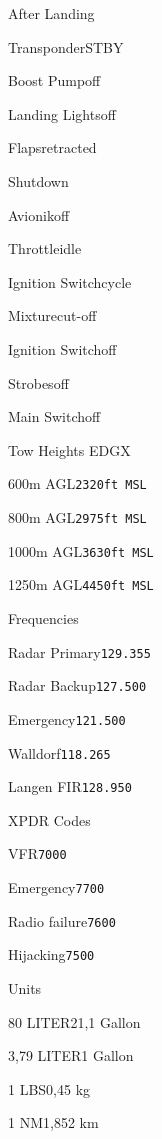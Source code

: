 \begin{checklist}{After Landing}
  \item{Transponder}{STBY}
  \item{Boost Pump}{off}
  \item{Landing Lights}{off}
  \item{Flaps}{retracted}
\end{checklist}

\begin{checklist}{Shutdown}
  \item{Avionik}{off}
  \item{Throttle}{idle}
  \item{Ignition Switch}{cycle}
  \item{Mixture}{cut-off}
  \item{Ignition Switch}{off}
  \item{Strobes}{off}
  \item{Main Switch}{off}
\end{checklist}

\begin{checklist}{Tow Heights EDGX}
  \item{600m AGL}{\texttt{2320ft MSL}}
  \item{800m AGL}{\texttt{2975ft MSL}}
  \item{1000m AGL}{\texttt{3630ft MSL}}
  \item{1250m AGL}{\texttt{4450ft MSL}}
\end{checklist}

\begin{checklist}{Frequencies}
  \item{Radar Primary}{\texttt{129.355}}
  \item{Radar Backup}{\texttt{127.500}}
  \item{Emergency}{\texttt{121.500}}
  \item{Walldorf}{\texttt{118.265}}
  \item{Langen FIR}{\texttt{128.950}}
\end{checklist}

\begin{checklist}{XPDR Codes}
  \item{VFR}{\texttt{7000}}
  \item{Emergency}{\texttt{7700}}
  \item{Radio failure}{\texttt{7600}}
  \item{Hijacking}{\texttt{7500}}
\end{checklist}

\begin{checklist}{Units}
  \item{80 LITER}{21,1 Gallon}
  \item{3,79 LITER}{1 Gallon}
  \item{1 LBS}{0,45 kg}
  \item{1 NM}{1,852 km}

\end{checklist}

